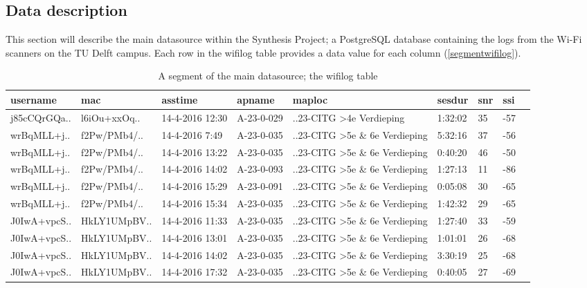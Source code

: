 \subsection{Data description}\label{datadescription}
This section will describe the main datasource within the Synthesis Project; a PostgreSQL database containing the logs from the Wi-Fi scanners on the TU Delft campus. Each row in the wifilog table provides a data value for each column (\autoref{segmentwifilog}).


\begin{table}[H]
	\centering
	\captionsetup{justification=centering}
	\caption{A segment of the main datasource; the wifilog table}
	\label{segmentwifilog}
	\begin{tabular}{@{}lllllllll@{}}
		\toprule
		\textbf{username} & \textbf{mac} & \textbf{asstime} & \textbf{apname}  & \textbf{maploc}                                                     & \textbf{sesdur} & \textbf{snr} & \textbf{ssi}          \\ \midrule
		j85cCQrGQa..      & l6iOu+xxOq.. & 14-4-2016 12:30  & A-23-0-029 & ..23-CITG \textgreater 4e Verdieping       & 1:32:02         & 35           & -57\\
		wrBqMLL+j..       & f2Pw/PMb4/.. & 14-4-2016 7:49   & A-23-0-035 & ..23-CITG \textgreater 5e \& 6e Verdieping & 5:32:16         & 37           & -56\\
		wrBqMLL+j..       & f2Pw/PMb4/.. & 14-4-2016 13:22  & A-23-0-035 & ..23-CITG \textgreater 5e \& 6e Verdieping & 0:40:20         & 46           & -50\\
		wrBqMLL+j..       & f2Pw/PMb4/.. & 14-4-2016 14:02  & A-23-0-093 & ..23-CITG \textgreater 5e \& 6e Verdieping & 1:27:13         & 11           & -86\\
		wrBqMLL+j..       & f2Pw/PMb4/.. & 14-4-2016 15:29  & A-23-0-091 & ..23-CITG \textgreater 5e \& 6e Verdieping & 0:05:08         & 30           & -65\\
		wrBqMLL+j..       & f2Pw/PMb4/.. & 14-4-2016 15:34  & A-23-0-035 & ..23-CITG \textgreater 5e \& 6e Verdieping & 1:42:32         & 29           & -65\\
		J0IwA+vpcS..      & HkLY1UMpBV.. & 14-4-2016 11:33  & A-23-0-035 & ..23-CITG \textgreater 5e \& 6e Verdieping & 1:27:40         & 33           & -59\\
		J0IwA+vpcS..      & HkLY1UMpBV.. & 14-4-2016 13:01  & A-23-0-035 & ..23-CITG \textgreater 5e \& 6e Verdieping & 1:01:01         & 26           & -68\\
		J0IwA+vpcS..      & HkLY1UMpBV.. & 14-4-2016 14:02  & A-23-0-035 & ..23-CITG \textgreater 5e \& 6e Verdieping & 3:30:19         & 25           & -68\\
		J0IwA+vpcS..      & HkLY1UMpBV.. & 14-4-2016 17:32  & A-23-0-035 & ..23-CITG \textgreater 5e \& 6e Verdieping & 0:40:05         & 27           & -69\\ \bottomrule
	\end{tabular}
\end{table}

